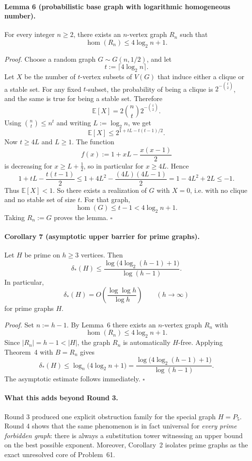 \paragraph{Lemma 6 (probabilistic base graph with logarithmic homogeneous number).}
For every integer $n\ge 2$, there exists an $n$-vertex graph $R_n$ such that
\[
\hom(R_n)\le 4\log_2 n +1.
\]

\emph{Proof.}
Choose a random graph $G\sim G(n,1/2)$, and let
\[
t:=\lceil 4\log_2 n\rceil.
\]
Let $X$ be the number of $t$-vertex subsets of $V(G)$ that induce either a clique or a stable set.
For any fixed $t$-subset, the probability of being a clique is $2^{-\binom{t}{2}}$, and the same is true for being a stable set.
Therefore
\[
\mathbb E[X]=2\binom{n}{t}2^{-\binom{t}{2}}.
\]
Using $\binom{n}{t}\le n^t$ and writing $L:=\log_2 n$, we get
\[
\mathbb E[X]\le 2^{1+tL-t(t-1)/2}.
\]
Now $t\ge 4L$ and $L\ge 1$.
The function
\[
f(x):=1+xL-\frac{x(x-1)}{2}
\]
is decreasing for $x\ge L+\tfrac12$, so in particular for $x\ge 4L$.
Hence
\[
1+tL-\frac{t(t-1)}{2}\le 1+4L^2-\frac{(4L)(4L-1)}{2}=1-4L^2+2L\le -1.
\]
Thus $\mathbb E[X]<1$.
So there exists a realization of $G$ with $X=0$, i.e. with no clique and no stable set of size $t$.
For that graph,
\[
\hom(G)\le t-1<4\log_2 n+1.
\]
Taking $R_n:=G$ proves the lemma.
\hfill$\square$

\medskip
\paragraph{Corollary 7 (asymptotic upper barrier for prime graphs).}
Let $H$ be prime on $h\ge 3$ vertices.
Then
\[
\delta_*(H)\le \frac{\log\bigl(4\log_2(h-1)+1\bigr)}{\log(h-1)}.
\]
In particular,
\[
\delta_*(H)=O\!\left(\frac{\log\log h}{\log h}\right)
\qquad (h\to\infty)
\]
for prime graphs $H$.

\emph{Proof.}
Set $n:=h-1$.
By Lemma~6 there exists an $n$-vertex graph $R_n$ with
\[
\hom(R_n)\le 4\log_2 n+1.
\]
Since $|R_n|=h-1<|H|$, the graph $R_n$ is automatically $H$-free.
Applying Theorem~4 with $B=R_n$ gives
\[
\delta_*(H)\le \log_n\bigl(4\log_2 n+1\bigr)=\frac{\log\bigl(4\log_2(h-1)+1\bigr)}{\log(h-1)}.
\]
The asymptotic estimate follows immediately.
\hfill$\square$

\medskip
\paragraph{What this adds beyond Round 3.}
Round 3 produced one explicit obstruction family for the special graph $H=P_5$.
Round 4 shows that the same phenomenon is in fact universal for \emph{every prime forbidden graph}:
there is always a substitution tower witnessing an upper bound on the best possible exponent.
Moreover, Corollary~2 isolates prime graphs as the exact unresolved core of Problem~61.

